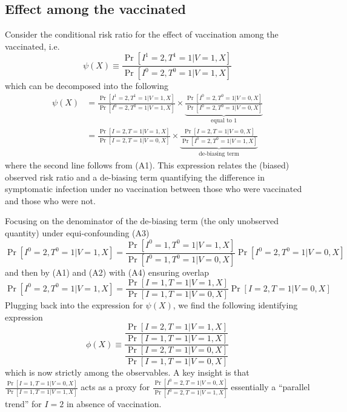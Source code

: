\documentclass[11pt]{article}
\begin{document}
\subsection{Effect among the vaccinated} \label{sec:effect_among_vaccinated}
Consider the conditional risk ratio for the effect of vaccination among the vaccinated, i.e.
\begin{equation*}
    \psi(X) \equiv \frac{\Pr[I^1 = 2, T^1 = 1 | V = 1, X]}{\Pr[I^0 = 2, T^0 = 1 | V = 1, X]}
\end{equation*}
which can be decomposed into the following
\begin{align*}
    \psi(X)  &= \frac{\Pr[I^1 = 2, T^1 = 1 | V = 1, X]}{\Pr[I^0 = 2, T^0 = 1 | V = 1, X]} \times \underbrace{\frac{\Pr[I^0 = 2, T^0 = 1 | V = 0, X]}{\Pr[I^0 = 2, T^0 = 1 | V = 0, X]}}_{\text{equal to } 1} \\
    &=\frac{\Pr[I = 2, T = 1 | V = 1, X]}{\Pr[I = 2, T = 1 | V = 0, X]} \times \underbrace{\frac{\Pr[I = 2, T = 1 | V = 0, X]}{\Pr[I^0 = 2, T^0 = 1 | V = 1, X]}}_{\text{de-biasing term}} 
\end{align*}
where the second line follows from (A1). This expression relates the (biased) observed risk ratio and a de-biasing term quantifying the difference in symptomatic infection under no vaccination between those who were vaccinated and those who were not. 

Focusing on the denominator of the de-biasing term (the only unobserved quantity) under equi-confounding (A3)
    \begin{equation*}
    \Pr[I^0 = 2, T^0 = 1  | V = 1, X] = \frac{\Pr[I^0 = 1, T^0 = 1  | V = 1, X]}{\Pr[I^0 = 1, T^0 = 1  | V = 0, X]}\Pr[I^0 = 2, T^0 = 1 | V = 0, X]
    \end{equation*}
and then by (A1) and (A2) with (A4) ensuring overlap
    \begin{equation*}
     \Pr[I^0 = 2, T^0 = 1  | V = 1, X] = \frac{\Pr[I = 1, T = 1  | V = 1, X]}{\Pr[I = 1, T = 1  | V = 0, X]}\Pr[I = 2, T = 1 | V = 0, X]
    \end{equation*}
Plugging back into the expression for $\psi(X)$, we find the following identifying expression 
    \begin{equation*}
         \phi(X) \equiv \dfrac{\dfrac{\Pr[I = 2, T = 1 | V = 1, X]}{\Pr[I = 1, T = 1 | V = 1, X]}}{\dfrac{\Pr[I = 2, T = 1 | V = 0, X]}{\Pr[I = 1, T = 1 | V = 0, X]}}
    \end{equation*}
which is now strictly among the observables. A key insight is that $\frac{\Pr[I = 1, T =1  | V = 0, X]}{\Pr[I = 1, T = 1 | V = 1, X]}$ acts as a proxy for $\frac{\Pr[I^0 = 2, T =1  | V = 0, X]}{\Pr[I^0 = 2, T = 1 | V = 1, X]}$ essentially a ``parallel trend'' for $I=2$ in absence of vaccination.
\end{document}
